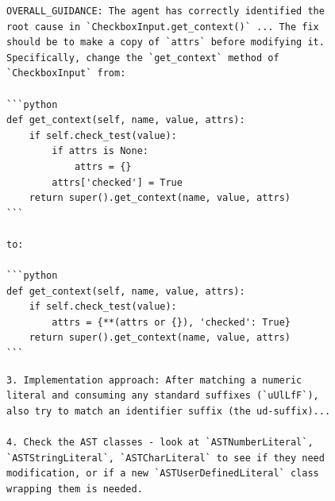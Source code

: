 \begin{lstlisting}[caption={\criticopus{} teacher (detailed prompt) at agent step $6$ on \texttt{django\_\_django-12193}. The agent's submitted patch reproduces both blocks verbatim.}, label={critic:lst:django12193_excerpt}]
OVERALL_GUIDANCE: The agent has correctly identified the
root cause in `CheckboxInput.get_context()` ... The fix
should be to make a copy of `attrs` before modifying it.
Specifically, change the `get_context` method of
`CheckboxInput` from:

```python
def get_context(self, name, value, attrs):
    if self.check_test(value):
        if attrs is None:
            attrs = {}
        attrs['checked'] = True
    return super().get_context(name, value, attrs)
```

to:

```python
def get_context(self, name, value, attrs):
    if self.check_test(value):
        attrs = {**(attrs or {}), 'checked': True}
    return super().get_context(name, value, attrs)
```
\end{lstlisting}

\begin{lstlisting}[caption={\criticopus{} teacher (detailed prompt) at agent step $6$ on \texttt{sphinx-doc\_\_sphinx-7590}. Bullet $4$'s ``or if a new \dots\ class is needed'' is the wrong fork; the agent takes it.}, label={critic:lst:sphinx7590_excerpt}]
3. Implementation approach: After matching a numeric
literal and consuming any standard suffixes (`uUlLfF`),
also try to match an identifier suffix (the ud-suffix)...

4. Check the AST classes - look at `ASTNumberLiteral`,
`ASTStringLiteral`, `ASTCharLiteral` to see if they need
modification, or if a new `ASTUserDefinedLiteral` class
wrapping them is needed.
\end{lstlisting}



